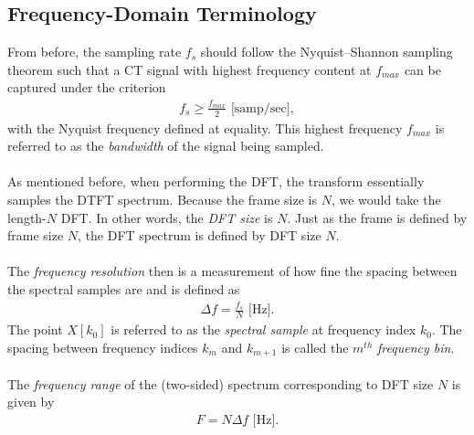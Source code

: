 \documentclass{report}
\begin{document}
\subsection{Frequency-Domain Terminology}
From before, the sampling rate $f_s$ should follow the Nyquist--Shannon sampling theorem such that 
a CT signal with highest frequency content at $f_{max}$ can be captured under the criterion
\begin{align}
    f_s \geq \frac{f_{max}}{2} \text{ [samp/sec]},
\end{align}
with the Nyquist frequency defined at equality. 
This highest frequency $f_{max}$ is referred to as the \emph{bandwidth} of the signal being sampled.
\\ \\
As mentioned before, when performing the DFT, the transform essentially samples the DTFT spectrum. Because 
the frame size is $N$, we would take the length-$N$ DFT. In other words, the \emph{DFT size} is $N$. 
Just as the frame is defined by frame size $N$, the DFT spectrum is defined by DFT size $N$.
\\ \\
The \emph{frequency resolution} then is a measurement of how fine the spacing between the spectral samples are 
and is defined as 
\begin{align}
    \Delta f = \frac{f_s}{N} \text{ [Hz]}.
\end{align}
The point $X[k_0]$ is referred to as the \emph{spectral sample} at frequency index $k_0$. The spacing between frequency indices 
$k_m$ and $k_{m+1}$ is called the $m^{th}$ \emph{frequency bin}.
\\ \\
The \emph{frequency range} of the (two-sided) spectrum corresponding to DFT size $N$ is given by 
\begin{align}
    F = N\Delta f \text{ [Hz]}.
\end{align}
\end{document}
